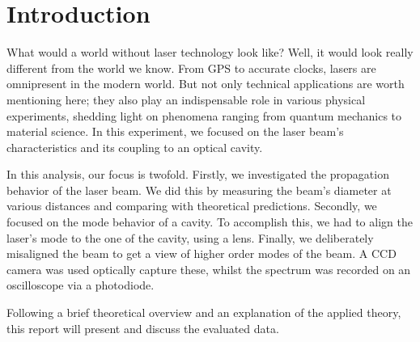 \section{Introduction}
What would a world without laser technology look like? Well, it would look really different from the world we know. From GPS to accurate clocks, lasers are omnipresent in the modern world. But not only technical applications are worth mentioning here; they also play an indispensable role in various physical experiments, shedding light on phenomena ranging from quantum mechanics to material science. In this experiment, we focused on the laser beam's characteristics and its coupling to an optical cavity.

In this analysis, our focus is twofold. Firstly, we investigated the propagation behavior of the laser beam. We did this by measuring the beam's diameter at various distances and comparing with theoretical predictions. Secondly, we focused on the mode behavior of a cavity. To accomplish this, we had to align the laser's mode to the one of the cavity, using a lens. Finally, we deliberately misaligned the beam to get a view of higher order modes of the beam. A CCD camera was used optically capture these, whilst the spectrum was recorded on an oscilloscope via a photodiode.

Following a brief theoretical overview and an explanation of the applied theory, this report will present and discuss the evaluated data.
